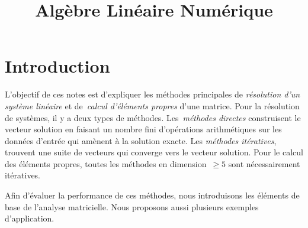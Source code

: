 \title{Algèbre Linéaire Numérique}

\vspace{-6em}{
	\tiny
	\hfill
	prière de bien vouloir envoyer des corrections/commentaires à
	\tt enric.meinhardt@ens-paris-saclay.fr
}\vspace{3em}

\newcommand{\ds}{\displaystyle}

\newcommand{\1}{\mathbf{1}}
\newcommand{\N}{\mathbf{N}}
\newcommand{\Z}{\mathbf{Z}}
\newcommand{\Q}{\mathbf{Q}}
\newcommand{\R}{\mathbf{R}}
\newcommand{\C}{\mathbf{C}}
\newcommand{\K}{\mathbf{K}}
\newcommand{\T}{\mathbf{T}}
\newcommand{\M}{\mathbf{M}}
\newcommand{\ud}{\mathrm{d}}
\newcommand{\e}{\mathbf{e}}
\newcommand{\x}{\mathbf{x}}
\newcommand{\y}{\mathbf{y}}
\newcommand{\z}{\mathbf{z}}
\newcommand{\Sp}{\mathrm{Sp}}
\newcommand{\OO}{\mathcal{O}}

\newcommand{\parens}[1]{\left(#1\right)} %
\newcommand{\pairing}[2]{\left\langle #1,#2\right\rangle} %

\newcommand{\abs}[1]{\left|#1\right|}
\newcommand{\Abs}[1]{\left\|#1\right\|}
\newcommand{\ABS}[1]{{\left\vert\kern-0.25ex\left\vert\kern-0.25ex\left\vert #1 \right\vert\kern-0.25ex\right\vert\kern-0.25ex\right\vert}}



\section{Introduction}

L'objectif de ces notes est d'expliquer les méthodes principales de
\emph{résolution d'un système linéaire} et de~\emph{calcul d'éléments
propres} d'une matrice.  Pour la résolution de systèmes, il y a deux types de
méthodes.  Les~\emph{méthodes directes} construisent le vecteur solution en
faisant un nombre fini d'opérations arithmétiques sur les données d'entrée
qui amènent à la solution exacte.  Les \emph{méthodes itératives}, trouvent
une suite de vecteurs qui converge vers le vecteur solution.  Pour le calcul
des éléments propres, toutes les méthodes en dimension~$\ge 5$ sont
nécessairement itératives.

Afin d'évaluer la performance de ces méthodes, nous introduisons les éléments
de base de l'analyse matricielle.
Nous proposons aussi plusieurs exemples d'application.

